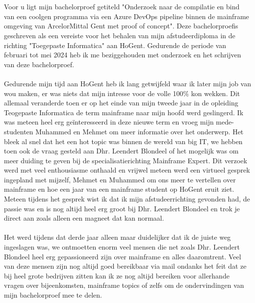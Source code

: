 
\chapter*{}%
\label{ch:voorwoord}

Voor u ligt mijn bachelorproef getiteld "Onderzoek naar de compilatie en bind van een coolgen programma via een Azure DevOps pipeline binnen de mainframe omgeving van ArcelorMittal Gent met proof of concept". 
Deze bachelorproefis geschreven als een vereiste voor het behalen van mijn afstudeerdiploma in de richting "Toegepaste Informatica" aan HoGent.
Gedurende de periode van februari tot mei 2024 heb ik me beziggehouden met onderzoek en het schrijven van deze bachelorproef. 
\\ \\
Gedurende mijn tijd aan HoGent heb ik lang getwijfeld waar ik later mijn job van wou maken, er was niets dat mijn intresse voor de volle 100\% kon wekken. 
Dit allemaal veranderde toen er op het einde van mijn tweede jaar in de opleiding Teogepaste Informatica de term mainframe naar mijn hoofd werd geslingerd. 
Ik was meteen heel erg geïnteresseerd in deze nieuwe term en vroeg mijn mede-studenten Muhammed en Mehmet om meer informatie over het onderwerp. 
Het bleek al snel dat het een hot topic was binnen de wereld van big IT, we hebben toen ook de vraag gesteld aan Dhr. Leendert Blondeel of het mogelijk was om meer duiding te geven bij de specialisatierichting Mainframe Expert. 
Dit verzoek werd met veel enthousiasme onthaald en vrijwel meteen werd een virtueel gesprek ingepland met mijzelf, Mehmet en Muhammed om ons meer te vertellen over mainframe en hoe een jaar van een mainframe student op HoGent eruit ziet.
Meteen tijdens het gesprek wist ik dat ik mijn afstudeerrichting gevonden had, de passie was en is nog altijd heel erg groot bij Dhr. Leendert Blondeel en trok je direct aan zoals alleen een magneet dat kan normaal. 
\\ \\
Het werd tijdens dat derde jaar alleen maar duidelijker dat ik de juiste weg ingeslagen was, we ontmoetten enorm veel mensen die net zoals Dhr. Leendert Blondeel heel erg gepassioneerd zijn over mainframe en alles daaromtrent. 
Veel van deze mensen zijn nog altijd goed bereikbaar via mail ondanks het feit dat ze bij heel grote bedrijven zitten kan ik ze nog altijd bereiken voor allerhande vragen over bijeenkomsten, mainframe topics of zelfs om de ondervindingen van mijn bachelorproef mee te delen. 
